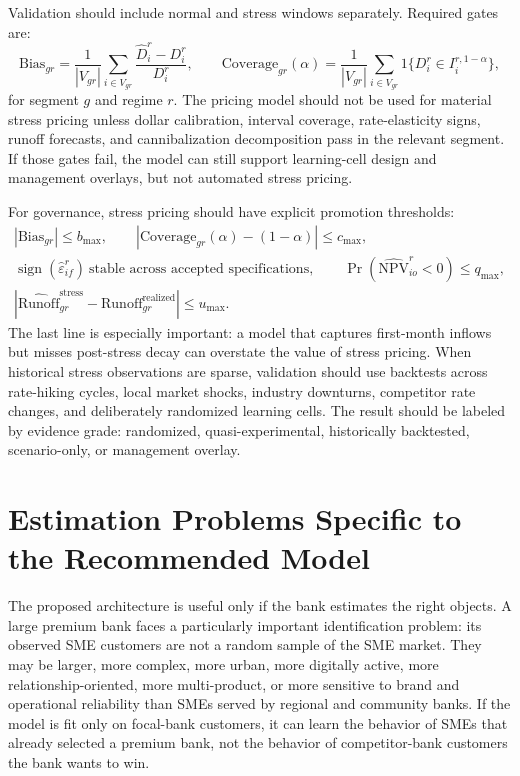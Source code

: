 \documentclass[11pt]{article}
\begin{document}
Validation should include normal and stress windows separately. Required gates
are:
\[
  \mathrm{Bias}_{gr}
  =
  \frac{1}{|V_{gr}|}\sum_{i\in V_{gr}}
  \frac{\widehat{D}_{i}^{r}-D_i^{r}}{D_i^{r}},
  \qquad
  \mathrm{Coverage}_{gr}(\alpha)
  =
  \frac{1}{|V_{gr}|}\sum_{i\in V_{gr}}
  1\{D_i^{r}\in I_i^{r,1-\alpha}\},
\]
for segment $g$ and regime $r$. The pricing model should not be used for
material stress pricing unless dollar calibration, interval coverage,
rate-elasticity signs, runoff forecasts, and cannibalization decomposition pass
in the relevant segment. If those gates fail, the model can still support
learning-cell design and management overlays, but not automated stress pricing.

For governance, stress pricing should have explicit promotion thresholds:
\[
\begin{gathered}
  |\mathrm{Bias}_{gr}|\le b_{\max},\qquad
  |\mathrm{Coverage}_{gr}(\alpha)-(1-\alpha)|\le c_{\max},\\
  \operatorname{sign}(\widehat{\varepsilon}_{if}^{r})
    \ \text{stable across accepted specifications},\qquad
  \Pr(\widehat{\mathrm{NPV}}_{io}^{r}<0)\le q_{\max},\\
  \left|
  \widehat{\mathrm{Runoff}}_{gr}^{\mathrm{stress}}
  -
  \mathrm{Runoff}_{gr}^{\mathrm{realized}}
  \right|\le u_{\max}.
\end{gathered}
\]
The last line is especially important: a model that captures first-month
inflows but misses post-stress decay can overstate the value of stress pricing.
When historical stress observations are sparse, validation should use
backtests across rate-hiking cycles, local market shocks, industry downturns,
competitor rate changes, and deliberately randomized learning cells. The result
should be labeled by evidence grade: randomized, quasi-experimental,
historically backtested, scenario-only, or management overlay.

\section{Estimation Problems Specific to the Recommended Model}

The proposed architecture is useful only if the bank estimates the right
objects. A large premium bank faces a particularly important identification
problem: its observed SME customers are not a random sample of the SME market.
They may be larger, more complex, more urban, more digitally active, more
relationship-oriented, more multi-product, or more sensitive to brand and
operational reliability than SMEs served by regional and community banks. If the
model is fit only on focal-bank customers, it can learn the behavior of SMEs
that already selected a premium bank, not the behavior of competitor-bank
customers the bank wants to win.
\end{document}
